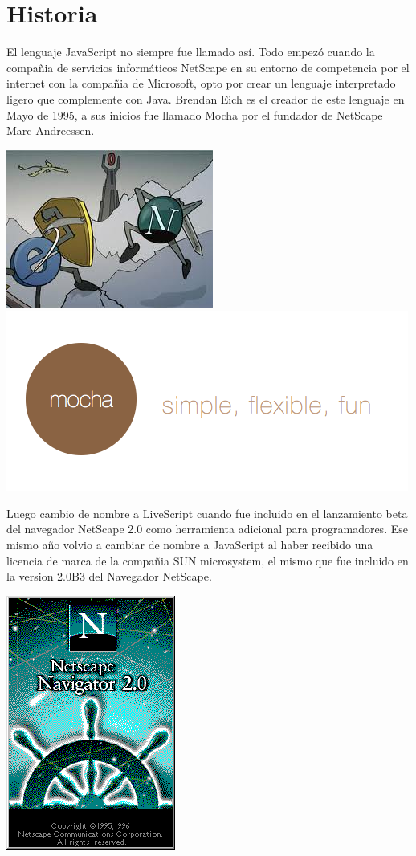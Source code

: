 \documentclass[11pt]{article} %
\begin{document}
\section{Historia}
El lenguaje JavaScript no siempre fue llamado así. Todo empezó cuando la compañia de servicios informáticos NetScape en su entorno de competencia por el internet con la compañia de Microsoft, opto por crear un lenguaje interpretado ligero que complemente con Java. Brendan Eich es el creador de este lenguaje en Mayo de 1995, a sus inicios fue llamado Mocha por el fundador de NetScape Marc Andreessen.\\
\begin{center}
\includegraphics[scale=0.5]{imagenes/MicrosoftvsNetscape.JPG}
\includegraphics[scale=0.5]{imagenes/mocha.png}
\end{center}
Luego cambio de nombre a LiveScript cuando fue incluido en el lanzamiento beta del navegador NetScape 2.0 como herramienta adicional para programadores. Ese mismo año volvio a cambiar de nombre a JavaScript al haber recibido una licencia de marca de la compañia SUN microsystem, el mismo que fue incluido en la version 2.0B3 del Navegador NetScape.\\
\begin{center}
\includegraphics[scale=0.5]{imagenes/netscape.png}
\end{center}
\end{document}
